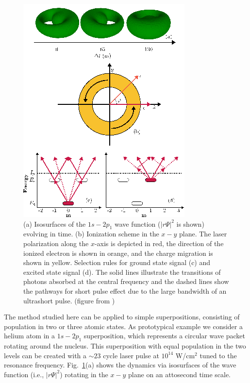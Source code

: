 \begin{figure}[!ht]
\centering
\includegraphics[width=0.7\linewidth]{figs/Photo_ionization/superpositions/Venzke_new_fig_1.png}
\caption{(a) Isosurfaces of the $1s-2p_1$ wave function ($|r\Psi|^2$ is shown) evolving in time. (b) Ionization scheme in the $x-y$ plane. The laser polarization along the $x$-axis is depicted in red, the direction of the ionized electron is shown in orange, and the charge migration is shown in yellow. Selection rules for ground state signal (c) and excited state signal (d). The solid lines illustrate the transitions of photons absorbed at the central frequency and the dashed lines show the pathways for short pulse effect due to the large bandwidth of an ultrashort pulse. (figure from \cite{venzke2021_wave})
} 
  \label{fig:dynamic_visualization}
\end{figure}

The method studied here can be applied to simple superpositions, consisting of population in two or three atomic states. As prototypical example we consider a helium atom in a $1s-2p_1$ superposition, which represents a circular wave packet rotating around the nucleus. This superposition with equal population in the two levels can be created with a $\sim23$ cycle laser pulse at $10^{14}$ W/cm$^2$ tuned to the resonance frequency. Fig.~\ref{fig:dynamic_visualization}(a) shows the dynamics via isosurfaces of the wave function (i.e., $\left|r\Psi\right|^2$) rotating in the $x-y$ plane on an attosecond time scale. 

